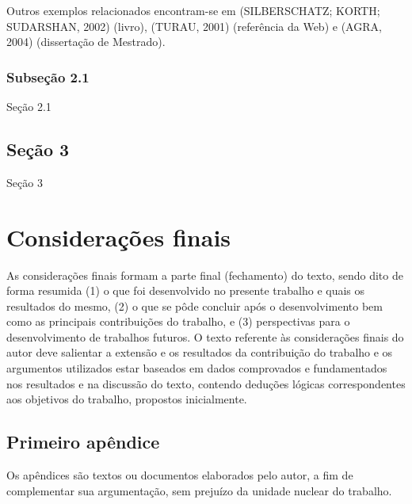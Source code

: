 \documentclass[
	12pt,			%
	openright,		%
	oneside,	
	a4paper,		%
	english,		%
	brazil			%
]{abntex2/abntex2}  %
\begin{document}
		Outros exemplos relacionados encontram-se em (SILBERSCHATZ; KORTH; SUDARSHAN, 2002) (livro), (TURAU, 2001) (referência da Web) e (AGRA, 2004) (dissertação de Mestrado).

		\subsection{Subseção 2.1}
	
			Seção 2.1
			
	\section{Seção 3}
	
		Seção 3
		
\chapter{Considerações finais}

	As considerações finais formam a parte final (fechamento) do texto, sendo dito de forma resumida (1) o que foi desenvolvido no presente trabalho e quais os resultados do mesmo, (2) o que se pôde concluir após o desenvolvimento bem como as principais contribuições do trabalho, e (3) perspectivas para o desenvolvimento de trabalhos futuros. O texto referente às considerações finais do autor deve salientar a extensão e os resultados da contribuição do trabalho e os argumentos utilizados estar baseados em dados comprovados e fundamentados nos resultados e na discussão do texto, contendo deduções lógicas correspondentes aos objetivos do trabalho, propostos inicialmente.

\postextual
{}



\begin{apendicesenv}

\chapter{Primeiro apêndice}

Os apêndices são textos ou documentos elaborados pelo autor, a fim de complementar sua argumentação, sem prejuízo da unidade nuclear do trabalho.

\end{apendicesenv}
\end{document}
